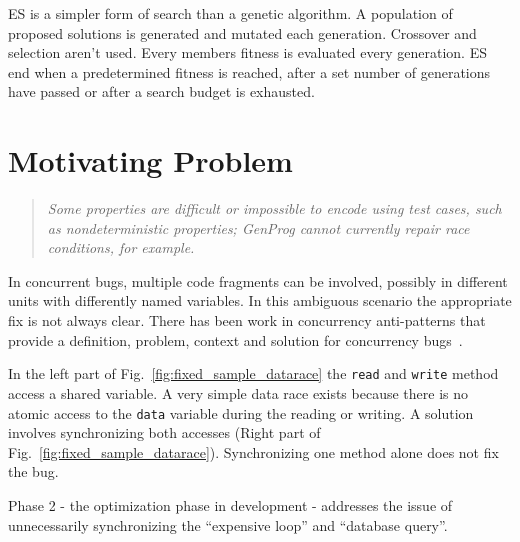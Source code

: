 \documentclass{llncs}
\begin{document}
ES is a simpler form of search than a genetic algorithm. A population of
proposed solutions is generated and mutated each generation. Crossover and
selection aren't used. Every members fitness is evaluated every generation. ES
end when a predetermined fitness is reached, after a set number of
generations have passed or after a search budget is exhausted.


\section{Motivating Problem}
\label{sec:motivation}

\begin{quote}
\textit{Some properties are difficult or impossible to encode using test cases,
such as nondeterministic properties; GenProg cannot currently repair race
conditions, for example.}~\cite{GNFW11}
\end{quote}

In concurrent bugs, multiple code fragments can be involved, possibly in different units with
differently named variables. In this ambiguous scenario the appropriate fix is
not always clear. There has been work in concurrency anti-patterns that provide
a definition, problem, context and solution for concurrency
bugs~\cite{BJ09,FKLV12}.

In the left part of Fig.~\ref{fig:fixed_sample_datarace} the \texttt{read} and
\texttt{write} method access a shared variable. A very simple data race exists
because there is no atomic access to the \texttt{data} variable during the
reading or writing.
A solution involves synchronizing both accesses (Right part of
Fig.~\ref{fig:fixed_sample_datarace}). Synchronizing one method alone does not
fix the bug.

Phase 2 - the optimization phase in development - addresses the issue of unnecessarily
synchronizing the ``expensive loop'' and ``database query''.

\end{document}
